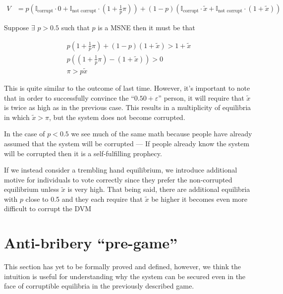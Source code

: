 \documentclass[12pt]{article}
\begin{document}
    \begin{align*}
      V &= p (\mathbb{I}_{\text{corrupt}} \cdot 0 + \mathbb{I}_{\text{not corrupt}} \cdot (1 + \frac{1}{p} \pi)) + (1 - p) (\mathbb{I}_{\text{corrupt}} \cdot \tilde{x} + \mathbb{I}_{\text{not corrupt}} \cdot (1 + \tilde{x}))
    \end{align*}

    Suppose $\exists$ $p > 0.5$ such that $p$ is a MSNE then it must be that

    \begin{align*}
      p (1 + \frac{1}{p} \pi) + (1 - p) (1 + \tilde{x}) > 1 + \tilde{x} \\
      p( (1 + \frac{1}{p} \pi) - (1 + \tilde{x})) > 0 \\
      \pi > p \tilde{x}
    \end{align*}

    This is quite similar to the outcome of last time. However, it's important to note that in
    order to successfully convince the ``$0.50 + \varepsilon$'' person, it will require that
    $\tilde{x}$ is twice as high as in the previous case. This results in a multiplicity of
    equilibria in which $\tilde{x} > \pi$, but the system does not become corrupted.

    In the case of $p < 0.5$ we see much of the same math because people have already assumed that
    the system will be corrupted --- If people already know the system will be corrupted then it
    is a self-fulfilling prophecy.

    If we instead consider a trembling hand equilibrium, we introduce additional motive for
    individuals to vote correctly since they prefer the non-corrupted equilibrium unless
    $\tilde{x}$ is very high. That being said, there are additional equilibria with $p$
    close to 0.5 and they each require that $\tilde{x}$ be higher it becomes even more difficult
    to corrupt the DVM



\section{Anti-bribery ``pre-game''}

  This section has yet to be formally proved and defined, however, we think the intuition is
  useful for understanding why the system can be secured even in the face of corruptible
  equilibria in the previously described game.
\end{document}
